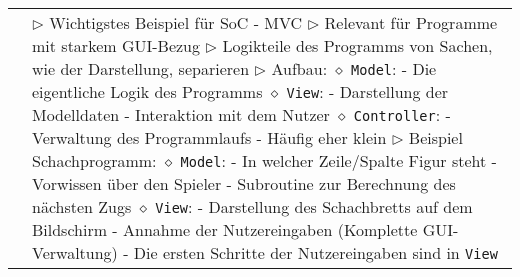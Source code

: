 \begin{longtable}{ | p{} p{} | }
	\makecell[l]{Model-View-Controller } & \makecell[l]{
	$\rhd$ Wichtigstes Beispiel für SoC - MVC \\
	$\rhd$ Relevant für Programme mit starkem GUI-Bezug \\
	$\rhd$ Logikteile des Programms von Sachen, wie der Darstellung, separieren \\
	$\rhd$ Aufbau: \\
	\hspace{0.4cm} $\diamond$ \texttt{Model}: \\
	\hspace{0.6cm} - Die eigentliche Logik des Programms \\
	\hspace{0.4cm} $\diamond$ \texttt{View}: \\
	\hspace{0.6cm} - Darstellung der Modelldaten \\
	\hspace{0.6cm} - Interaktion mit dem Nutzer \\
	\hspace{0.4cm} $\diamond$ \texttt{Controller}: \\
	\hspace{0.6cm} - Verwaltung des Programmlaufs \\ 
	\hspace{0.6cm} - Häufig eher klein \\
	$\rhd$ Beispiel Schachprogramm: \\
	\hspace{0.4cm} $\diamond$ \texttt{Model}: \\
	\hspace{0.6cm} - In welcher Zeile/Spalte Figur steht \\
	\hspace{0.6cm} - Vorwissen über den Spieler \\
	\hspace{0.6cm} - Subroutine zur Berechnung des nächsten Zugs \\
	\hspace{0.4cm} $\diamond$ \texttt{View}: \\
	\hspace{0.6cm} - Darstellung des Schachbretts auf dem Bildschirm \\
	\hspace{0.6cm} - Annahme der Nutzereingaben (Komplette GUI-Verwaltung) \\
	\hspace{0.6cm} - Die ersten Schritte der Nutzereingaben sind in \texttt{View} \\
}
\end{longtable}
